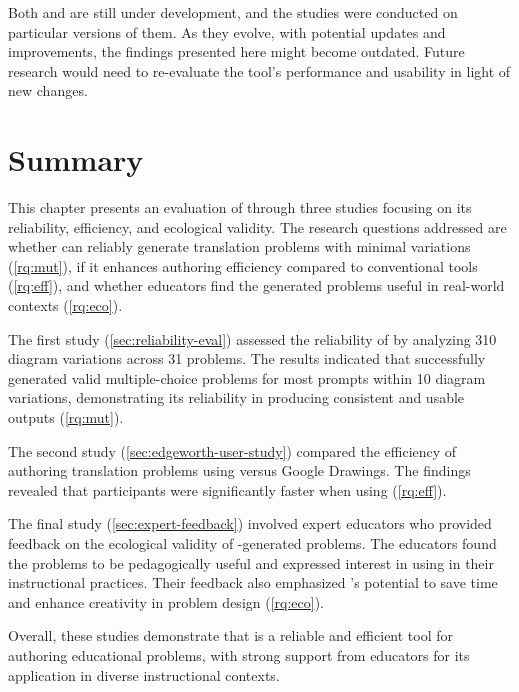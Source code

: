 
Both \Penrose and \Edgeworth are still under development, and the studies were conducted on particular versions of them. As they evolve, with potential updates and improvements, the findings presented here might become outdated. Future research would need to re-evaluate the tool's performance and usability in light of new changes. 

\section{Summary}

This chapter presents an evaluation of \Edgeworth through three studies focusing on its reliability, efficiency, and ecological validity. The research questions addressed are whether \Edgeworth can reliably generate translation problems with minimal variations (\ref{rq:mut}), if it enhances authoring efficiency compared to conventional tools (\ref{rq:eff}), and whether educators find the generated problems useful in real-world contexts (\ref{rq:eco}).

The first study (\cref{sec:reliability-eval}) assessed the reliability of \Edgeworth by analyzing 310 diagram variations across 31 problems. The results indicated that \Edgeworth successfully generated valid multiple-choice problems for most prompts within 10 diagram variations, demonstrating its reliability in producing consistent and usable outputs (\ref{rq:mut}).

The second study (\cref{sec:edgeworth-user-study}) compared the efficiency of authoring translation problems using \Edgeworth versus Google Drawings. The findings revealed that participants were significantly faster when using \Edgeworth (\ref{rq:eff}).

The final study (\cref{sec:expert-feedback}) involved expert educators who provided feedback on the ecological validity of \Edgeworth-generated problems. The educators found the problems to be pedagogically useful and expressed interest in using \Edgeworth in their instructional practices. Their feedback also emphasized \Edgeworth's potential to save time and enhance creativity in problem design (\ref{rq:eco}).

Overall, these studies demonstrate that \Edgeworth is a reliable and efficient tool for authoring educational problems, with strong support from educators for its application in diverse instructional contexts.





